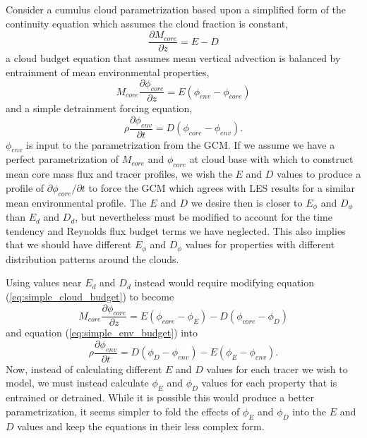 \documentclass[12pt]{article}
\begin{document}
Consider a cumulus cloud parametrization based upon a simplified form of 
the continuity equation which assumes the cloud fraction is constant,
\begin{equation}
    \label{eq:simple_continuity}
    \frac{\partial M_{core}}{\partial z} = E - D
\end{equation}
a cloud budget equation that assumes mean vertical advection is balanced 
by entrainment of mean environmental properties,
\begin{equation}
    \label{eq:simple_cloud_budget}
    M_{core} \frac{\partial \phi_{core}}{\partial z} = 
    E(\phi_{env} - \phi_{core})
\end{equation}
and a simple detrainment forcing equation,
\begin{equation}
    \label{eq:simple_env_budget}
    \rho \frac{\partial \phi_{env}}{\partial t} = D(\phi_{core} - \phi_{env}).
\end{equation}
$\phi_{env}$ is input to the parametrization from the GCM.  If we assume 
we have a perfect parametrization of $M_{core}$ and $\phi_{core}$ at 
cloud base with which to construct mean core mass flux and tracer 
profiles, we wish the $E$ and $D$ values to produce a profile of 
$\partial \phi_{core} / \partial t$ to force the GCM which agrees 
with LES results for a similar mean environmental profile.  The $E$ and 
$D$ we desire then is closer to $E_{\phi}$ and $D_{\phi}$ than $E_d$ 
and $D_d$, but nevertheless must be modified to account for the time 
tendency and Reynolds flux budget terms we have neglected.  This also 
implies that we should have different $E_{\phi}$ and $D_{\phi}$ values 
for properties with different distribution patterns around the clouds.

Using values near $E_d$ and $D_d$ instead would require modifying 
equation (\ref{eq:simple_cloud_budget}) to become
\begin{equation}
    \label{eq:less_simple_cloud_budget}
    M_{core} \frac{\partial \phi_{core}}{\partial z} 
       = E(\phi_{core} - \phi_E) - D(\phi_{core} - \phi_D)
\end{equation}
and equation (\ref{eq:simple_env_budget}) into
\begin{equation}
    \label{eq:less_simple_env_budget}
    \rho \frac{\partial \phi_{env}}{\partial t} 
       = D(\phi_D - \phi_{env}) - E(\phi_E - \phi_{env}).
\end{equation}
Now, instead of calculating different $E$ and $D$ values for each tracer 
we wish to model, we must instead calculate $\phi_E$ and $\phi_D$ values
for each property that is entrained or detrained.  While it is possible 
this would produce a better parametrization, it seems simpler to fold 
the effects of $\phi_E$ and $\phi_D$ into the $E$ and $D$ values and 
keep the equations in their less complex form.
\end{document}

